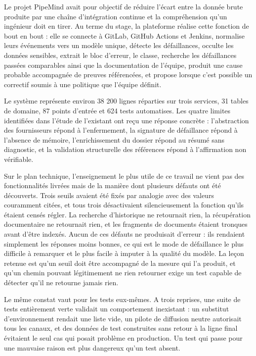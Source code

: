 \documentclass[12pt,a4paper,oneside]{report}
\begin{document}
Le projet PipeMind avait pour objectif de réduire l'écart entre la donnée brute
produite par une chaîne d'intégration continue et la compréhension qu'un
ingénieur doit en tirer. Au terme du stage, la plateforme réalise cette fonction
de bout en bout : elle se connecte à GitLab, GitHub Actions et Jenkins, normalise
leurs événements vers un modèle unique, détecte les défaillances, occulte les
données sensibles, extrait le bloc d'erreur, le classe, recherche les
défaillances passées comparables ainsi que la documentation de l'équipe, produit
une cause probable accompagnée de preuves référencées, et propose lorsque c'est
possible un correctif soumis à une politique que l'équipe définit.

Le système représente environ 38 200 lignes réparties sur trois services, 31
tables de domaine, 87 points d'entrée et 624 tests automatises. Les quatre limites
identifiées dans l'étude de l'existant ont reçu une réponse concrète :
l'abstraction des fournisseurs répond à l'enfermement, la signature de défaillance
répond à l'absence de mémoire, l'enrichissement du dossier répond au résumé sans
diagnostic, et la validation structurelle des références répond à l'affirmation
non vérifiable.

Sur le plan technique, l'enseignement le plus utile de ce travail ne vient pas des
fonctionnalités livrées mais de la manière dont plusieurs défauts ont été
découverts. Trois seuils avaient été fixés par analogie avec des valeurs
couramment citées, et tous trois désactivaient silencieusement la fonction qu'ils
étaient censés régler. La recherche d'historique ne retournait rien, la
récupération documentaire ne retournait rien, et les fragments de documents
étaient tronques avant d'être indexés. Aucun de ces défauts ne produisait
d'erreur : ils rendaient simplement les réponses moins bonnes, ce qui est le mode
de défaillance le plus difficile à remarquer et le plus facile à imputer à la
qualité du modèle. La leçon retenue est qu'un seuil doit être accompagné de la
mesure qui l'a produit, et qu'un chemin pouvant légitimement ne rien retourner
exige un test capable de détecter qu'il ne retourne jamais rien.

Le même constat vaut pour les tests eux-mêmes. A trois reprises, une suite de
tests entièrement verte validait un comportement inexistant : un substitut
d'environnement rendait une liste vide, un pilote de diffusion neutre autorisait
tous les canaux, et des données de test construites sans retour à la ligne final
évitaient le seul cas qui posait problème en production. Un test qui passe pour
une mauvaise raison est plus dangereux qu'un test absent.
\end{document}
